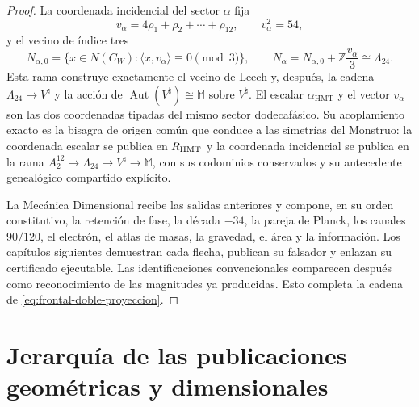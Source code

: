\begin{proof}
La coordenada incidencial del sector \(\alpha\) fija
\[
v_\alpha=4\rho_1+\rho_2+\cdots+\rho_{12},
\qquad v_\alpha^2=54,
\]
y el vecino de índice tres
\[
N_{\alpha,0}
=\{x\in N(C_W):\langle x,v_\alpha\rangle\equiv0\pmod3\},
\qquad
N_\alpha=N_{\alpha,0}+\mathbb Z\frac{v_\alpha}{3}
\cong\Lambda_{24}.
\]
Esta rama construye exactamente el vecino de Leech y, después, la cadena
\(\Lambda_{24}\to V^\natural\) y la acción de
\(\operatorname{Aut}(V^\natural)\cong\mathbb M\) sobre \(V^\natural\). El
escalar \(\alpha_{\mathrm{HMT}}\) y el vector \(v_\alpha\) son las dos
coordenadas tipadas del mismo sector dodecafásico. Su acoplamiento exacto es
la bisagra de origen común que conduce a las simetrías del Monstruo: la
coordenada escalar se publica en \(\mathbb R_{\rm HMT}\) y la coordenada
incidencial se publica en la rama
\(A_2^{12}\to\Lambda_{24}\to V^\natural\to\mathbb M\), con sus codominios
conservados y su antecedente genealógico compartido explícito.

La Mecánica Dimensional recibe las salidas anteriores y compone, en su orden
constitutivo, la retención de fase, la década \(-34\), la pareja de Planck,
los canales \(90/120\), el electrón, el atlas de masas, la gravedad, el área
y la información. Los capítulos siguientes demuestran cada flecha, publican
su falsador y enlazan su certificado ejecutable. Las identificaciones
convencionales comparecen después como reconocimiento de las magnitudes ya
producidas. Esto completa la cadena de
\eqref{eq:frontal-doble-proyeccion}.
\end{proof}

\section*{Jerarquía de las publicaciones geométricas y dimensionales}


